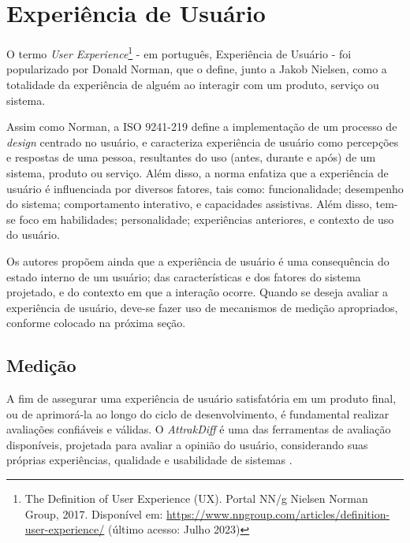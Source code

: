 \section{Experiência de Usuário}
\label{sec:Experiencia de Usuario}

O termo \textit{User Experience}\footnote{The Definition of User Experience (UX). Portal NN/g Nielsen Norman Group, 2017. Disponível
em: \url{https://www.nngroup.com/articles/definition-user-experience/} (último acesso: Julho 2023)} - em português, Experiência de Usuário - foi popularizado por Donald Norman, 
que o define, junto a Jakob Nielsen, como a totalidade da experiência de alguém ao interagir com um produto, serviço ou sistema. 

Assim como Norman, a ISO 9241-219 \cite{iso9241210} define a implementação de um processo de \textit{design} centrado no usuário, e caracteriza experiência de usuário como percepções e 
respostas de uma pessoa, resultantes do uso (antes, durante e após) de um sistema, produto ou serviço. Além disso, a norma enfatiza que a experiência de usuário 
é influenciada por diversos fatores, tais como: funcionalidade; desempenho do sistema; comportamento interativo, e capacidades assistivas. Além disso, tem-se foco em habilidades; 
personalidade; experiências anteriores, e contexto de uso do usuário.

Os autores  propõem ainda que a experiência de usuário é uma consequência do estado interno de um usuário; das características e dos fatores do sistema projetado, 
e do contexto em que a interação ocorre. Quando se deseja avaliar a experiência de usuário, deve-se fazer uso de mecanismos de medição apropriados, conforme colocado na próxima seção.

\subsection{Medição}
\label{sec:Medição2}

A fim de assegurar uma experiência de usuário satisfatória em um produto final, ou de aprimorá-la ao longo do ciclo de desenvolvimento, é fundamental realizar avaliações confiáveis e válidas. 
O \textit{AttrakDiff} é uma das ferramentas de avaliação disponíveis, projetada para avaliar a opinião do usuário, considerando suas próprias experiências, qualidade e usabilidade de sistemas \cite{hassenzahl2003}. 

